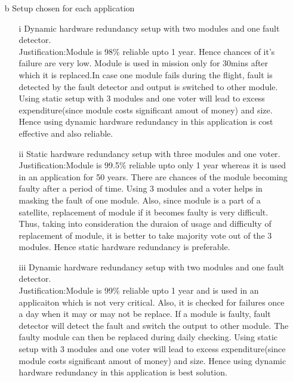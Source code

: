 \documentclass[]{article}
\begin{document}
\begin{itemize}
	\item[b] Setup chosen for each application
	\begin{itemize}
			\item[i]Dynamic hardware redundancy setup with two modules and one fault detector.\\Justification:Module is 98\% reliable upto 1 year. Hence chances of it's failure are very low. Module is used in mission only for 30mins after which it is replaced.In case one module fails  during the flight, fault is detected by the fault detector and output is switched to other module. Using static setup with 3 modules and one voter will lead to excess expenditure(since module costs significant amout of money) and size. Hence using dynamic hardware redundancy in this application is cost effective and also reliable.
		\item[ii]Static hardware redundancy setup with three modules and one voter.\\Justification:Module is 99.5\% reliable upto only 1 year whereas it is used in an application for 50 years. There are chances of the module becoming faulty after a period of time. Using 3 modules and a voter helps in masking the fault of one module. Also, since module is a part of a satellite, replacement of module if it becomes faulty is very difficult. Thus, taking into consideration the duraion of usage and difficulty of replacement of module, it is better to take majority vote out of the 3 modules. Hence static hardware redundancy is preferable.
		\item[iii]Dynamic hardware redundancy setup with two modules and one fault detector.\\Justification:Module is 99\% reliable upto 1 year and is used in an applicaiton which is not very critical. Also, it is checked for failures once a day when it may or may not be replace. If a module is faulty, fault detector will detect the fault and switch the output to other module. The faulty module can then be replaced during daily checking.  Using static setup with 3 modules and one voter will lead to excess expenditure(since module costs significant amout of money) and size.  Hence using dynamic hardware redundancy in this application is best solution.
	\end{itemize}

\end{itemize} 
\end{document}
